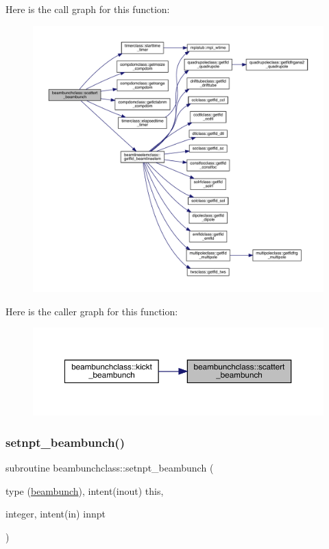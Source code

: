 Here is the call graph for this function\+:\nopagebreak
\begin{figure}[H]
\begin{center}
\leavevmode
\includegraphics[width=350pt]{namespacebeambunchclass_a3da6bfdf683e278c6005fddbceac16db_cgraph}
\end{center}
\end{figure}
Here is the caller graph for this function\+:\nopagebreak
\begin{figure}[H]
\begin{center}
\leavevmode
\includegraphics[width=350pt]{namespacebeambunchclass_a3da6bfdf683e278c6005fddbceac16db_icgraph}
\end{center}
\end{figure}
\mbox{\label{namespacebeambunchclass_af1b14b706bd1283ff6c5a7cec4b06c48}} 
\subsubsection{\texorpdfstring{setnpt\_beambunch()}{setnpt\_beambunch()}}
{\footnotesize\ttfamily subroutine beambunchclass\+::setnpt\+\_\+beambunch (\begin{DoxyParamCaption}\item[{type (\mbox{\hyperlink{namespacebeambunchclass_structbeambunchclass_1_1beambunch}{beambunch}}), intent(inout)}]{this,  }\item[{integer, intent(in)}]{innpt }\end{DoxyParamCaption})}



